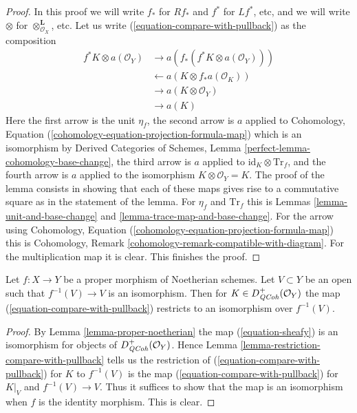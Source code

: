 \begin{proof}
In this proof we will write $f_*$ for $Rf_*$ and $f^*$ for $Lf^*$, etc,
and we will write $\otimes$ for $\otimes^\mathbf{L}_{\mathcal{O}_X}$, etc.
Let us write (\ref{equation-compare-with-pullback}) as the composition
\begin{align*}
f^*K \otimes a(\mathcal{O}_Y)
& \to
a(f_*(f^*K \otimes a(\mathcal{O}_Y))) \\
& \leftarrow
a(K \otimes f_*a(\mathcal{O}_K)) \\
& \to
a(K \otimes \mathcal{O}_Y) \\
& \to
a(K)
\end{align*}
Here the first arrow is the unit $\eta_f$, the second arrow is $a$
applied to Cohomology, Equation
(\ref{cohomology-equation-projection-formula-map}) which is an
isomorphism by Derived Categories of Schemes, Lemma
\ref{perfect-lemma-cohomology-base-change}, the third arrow is
$a$ applied to $\text{id}_K \otimes \text{Tr}_f$, and the fourth
arrow is $a$ applied to the isomorphism $K \otimes \mathcal{O}_Y = K$.
The proof of the lemma consists in showing that each of these
maps gives rise to a commutative square as in the statement of the lemma.
For $\eta_f$ and $\text{Tr}_f$ this is
Lemmas \ref{lemma-unit-and-base-change} and
\ref{lemma-trace-map-and-base-change}.
For the arrow using Cohomology, Equation
(\ref{cohomology-equation-projection-formula-map})
this is Cohomology, Remark \ref{cohomology-remark-compatible-with-diagram}.
For the multiplication map it is clear. This finishes the proof.
\end{proof}

\begin{lemma}
\label{lemma-compare-on-open}
Let $f : X \to Y$ be a proper morphism of Noetherian schemes. Let $V \subset Y$
be an open such that $f^{-1}(V) \to V$ is an isomorphism. Then for
$K \in D_{\mathit{QCoh}}^+(\mathcal{O}_Y)$ the map (\ref{equation-compare-with-pullback})
restricts to an isomorphism over $f^{-1}(V)$.
\end{lemma}

\begin{proof}
By Lemma \ref{lemma-proper-noetherian} the map (\ref{equation-sheafy}) is an
isomorphism for objects of $D_{\mathit{QCoh}}^+(\mathcal{O}_Y)$. Hence
Lemma \ref{lemma-restriction-compare-with-pullback} tells us the
restriction of (\ref{equation-compare-with-pullback}) for $K$
to $f^{-1}(V)$ is the map (\ref{equation-compare-with-pullback})
for $K|_V$ and $f^{-1}(V) \to V$. Thus it suffices to show that
the map is an isomorphism when $f$ is the identity morphism. This is clear.
\end{proof}

